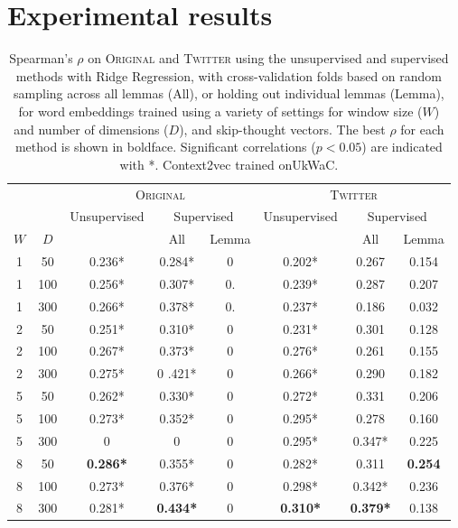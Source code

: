 \documentclass[11pt]{article}
\newcommand\original{\textsc{Original}\xspace}
\newcommand\twitter{\textsc{Twitter}\xspace}
\begin{document}
\section{Experimental results\label{sec:results}}






\begin{table*}
\begin{center}
\small
\begin{tabular}{cc|ccc|ccc}
& & \multicolumn{3}{c|}{\textsc{Original}} &
  \multicolumn{3}{c}{\textsc{Twitter}}\\ 

 &  & \multirow{2}{*}{Unsupervised}  & \multicolumn{2}{c|}{Supervised} & \multirow{2}{*}{Unsupervised} & \multicolumn{2}{c}{Supervised}  \\ 
$W$ & $D$ & & All & Lemma & & All & Lemma\\
\hline
1 & 50  & 0.236* & 0.284* & 0 & 0.202* & 0.267 & 0.154 \\   
1 & 100 & 0.256* & 0.307* & 0. & 0.239* & 0.287 & 0.207 \\   
1 & 300 & 0.266* & 0.378* & 0. & 0.237* & 0.186 & 0.032 \\  
2 & 50  & 0.251* & 0.310* & 0 & 0.231* & 0.301 & 0.128 \\   
2 & 100 & 0.267* & 0.373* & 0 & 0.276* & 0.261\phantom{*} & 0.155\\  
2 & 300 & 0.275* & 0 .421* & 0 & 0.266* & 0.290\phantom{*} & 0.182 \\  
\hline
5 & 50  & 0.262* & 0.330* & 0 & 0.272* & 0.331 & 0.206 \\   
5 & 100 & 0.273* & 0.352* & 0 & 0.295* & 0.278 & 0.160 \\  
5 & 300 & 0 & 0 & 0 & 0.295* & 0.347* & 0.225 \\  
\hline
8 & 50  & \textbf{0.286*} & 0.355* & 0 & 0.282* &0.311\phantom{*} & \textbf{0.254} \\   
8 & 100 & 0.273* & 0.376* & 0 & 0.298* & 0.342* & 0.236 \\  
8 & 300 & 0.281* & \textbf{0.434*} & 0 & \textbf{0.310*} & \textbf{0.379*} & 0.138 \\    
\hline
\end{tabular}
\caption{Spearman's $\rho$ on \original and \twitter using the
  unsupervised and supervised methods with Ridge Regression, with cross-validation folds
  based on random sampling across all lemmas (All), or holding out
  individual lemmas (Lemma), for word embeddings trained using a
  variety of settings for window size ($W$) and number of dimensions
  ($D$), and skip-thought vectors. The best $\rho$ for each method is
  shown in boldface. Significant correlations ($p<0.05$) are indicated
  with *. Context2vec trained onUkWaC.
\label{tbl:results}}


\end{center}
\end{table*}
\end{document}
